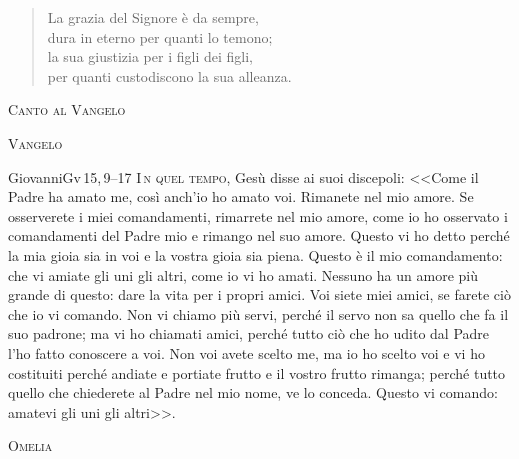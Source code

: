 \documentclass[11pt,a4paper]{book}
\renewcommand{\intestfont}[1]{{\Large\scshape\textcolor{SAGEcolor}{#1}}} %
\newcommand{\sottomomento}[1]{{\intestfont{#1}}\par\medskip}
\begin{document}
\begin{pages}
\begin{Leftside}
\begin{verse}
            La grazia del Signore è da sempre,\\
            dura in eterno per quanti lo temono;\\
            la sua giustizia per i figli dei figli,\\
            per quanti custodiscono la sua alleanza.\\
            \rispostasalmo
        \end{verse}
  \pend 
  \pstart 
  \vspace{0.5in}
        \sottomomento{\textcolor{SAGEcolor}{Canto al Vangelo}}
  \pend 
  \pstart 
  \vspace{0.2in}
        \alleluia
  \pend 
  \pstart 
  \vspace{0.5in}
        \sottomomento{Vangelo}
  \pend 
  \pstart 
  \vspace{0.2in}
        \begin{vangelo}{Giovanni}{Gv\,15,\,9--17}
        \lettrine[nindent=-1pt,slope=0.4em,lines=3]{I}{\,n quel tempo}, Gesù disse ai suoi discepoli:
        <<Come il Padre ha amato me, così anch'io ho amato voi. Rimanete nel mio amore. Se osserverete i miei comandamenti, rimarrete nel mio amore, come io ho osservato i comandamenti del Padre mio e rimango nel suo amore. Questo vi ho detto perché la mia gioia sia in voi e la vostra gioia sia piena.
        Questo è il mio comandamento: che vi amiate gli uni gli altri, come io vi ho amati. Nessuno ha un amore più grande di questo: dare la vita per i propri amici. Voi siete miei amici, se farete ciò che io vi comando. Non vi chiamo più servi, perché il servo non sa quello che fa il suo padrone; ma vi ho chiamati amici, perché tutto ciò che ho udito dal Padre l'ho fatto conoscere a voi.
        Non voi avete scelto me, ma io ho scelto voi e vi ho costituiti perché andiate e portiate frutto e il vostro frutto rimanga; perché tutto quello che chiederete al Padre nel mio nome, ve lo conceda. Questo vi comando: amatevi gli uni gli altri>>.\\
        \end{vangelo}
  \pend 
  \pstart 
  \vspace{0.5in}
        \sottomomento{Omelia}
  \pend 
  \pstart 
  \vspace{0.2in}
        \omelia
  \pend 
  \endnumbering
\end{Leftside}
\begin{Rightside} 
  \beginnumbering

\end{Rightside}
\end{pages}
\end{document}
